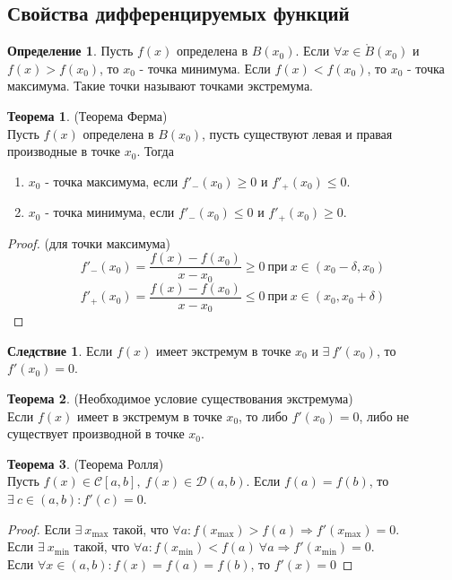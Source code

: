 \documentclass[a4paper, 12pt]{article}
\theoremstyle{definition}
\newtheorem*{definition}{Определение}
\newtheorem*{theorem}{Теорема}
\newtheorem*{consequense}{Следствие}
\begin{document}
        \subsection{Свойства дифференцируемых функций}
        \begin{definition}
            Пусть $f(x)$ определена в $B(x_0)$. Если  $\forall x\in \mathring{B}(x_0)$ и\\
            $f(x)>f(x_0)$, то $x_0$ - точка минимума. Если $f(x)<f(x_0)$, то $x_0$ - точка максимума. Такие точки называют точками экстремума.
        \end{definition} 
        \begin{theorem} (Теорема Ферма)\\
            Пусть $f(x)$ определена в $B(x_0)$, пусть существуют левая и правая производные в точке $x_0$. Тогда
            \begin{enumerate}
                \item $x_0$ - точка максимума, если $f'_-(x_0)\geq 0$ и $f'_+(x_0)\leq 0$.
                \item $x_0$ - точка минимума, если $f'_-(x_0)\leq 0$ и $f'_+(x_0)\geq 0$.
            \end{enumerate}
        \end{theorem} 
        \begin{proof} (для точки максимума)
                \[f'_-(x_0)=\frac{f(x)-f(x_0)}{x-x_0}\geq 0\ \text{при}\ x\in (x_0-\delta,x_0)\]
                \[f'_+(x_0)=\frac{f(x)-f(x_0)}{x-x_0}\leq 0\ \text{при}\ x\in (x_0,x_0+\delta)\]
        \end{proof} 
        \begin{consequense}
            Если $f(x)$ имеет экстремум в точке $x_0$ и $\exists\ f'(x_0)$, то $f'(x_0)=0$.
        \end{consequense} 
        \begin{theorem} (Необходимое условие существования экстремума)\\
            Если $f(x)$ имеет в экстремум в точке $x_0$, то либо $f'(x_0)=0$, либо не существует производной в точке $x_0$.
        \end{theorem} 
        \begin{theorem} (Теорема Ролля)\\
            Пусть $f(x)\in \mathcal{C}[a,b],\ f(x)\in \mathcal{D}(a,b)$. Если $f(a)=f(b)$, то $\exists\ c\in (a,b): f'(c)=0$.
        \end{theorem} 
        \begin{proof}
            Если $\exists\ x_{\max}$ такой, что $\forall a: f(x_{\max})>f(a) \Rightarrow f'(x_{\max})=0$.\\
            Если $\exists\ x_{\min}$ такой, что $\forall a: f(x_{\min})<f(a)\ \forall a \Rightarrow f'(x_{\min})=0$.\\
            Если $\forall x\in (a,b): f(x)=f(a)=f(b)$, то $f'(x)=0$
        \end{proof}
\end{document}
